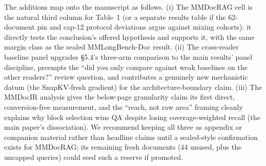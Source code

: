 \documentclass[letterpaper]{article} %
\begin{document}
The additions map onto the manuscript as follows. (i) The MMDocRAG cell is the natural third column for Table~1 (or a separate results table if the 62-document pin and cap-12 protocol deviations argue against mixing cohorts): it directly tests the conclusion's offered hypothesis and supports it, with the same margin class as the sealed MMLongBench-Doc result. (ii) The cross-reader baseline panel upgrades \S5.4's three-arm comparison to the main results' panel discipline, preempts the ``did you only compare against weak baselines on the other readers?'' review question, and contributes a genuinely new mechanistic datum (the SnapKV-fresh gradient) for the architecture-boundary claim. (iii) The MMDocIR analysis gives the below-page granularity claim its first direct, conversion-free measurement, and the ``reach, not raw area'' framing cleanly explains why block selection wins QA despite losing coverage-weighted recall (the main paper's dissociation). We recommend keeping all three as appendix or companion material rather than headline claims until a sealed-style confirmation exists for MMDocRAG; its remaining fresh documents (44 unused, plus the uncapped queries) could seed such a reserve if promoted.


\end{document}
